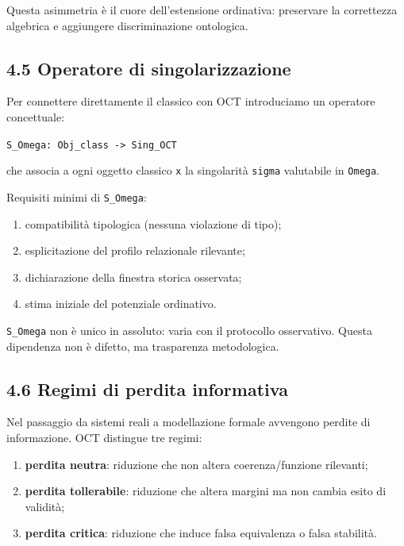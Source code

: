 Questa asimmetria è il cuore dell'estensione ordinativa: preservare la correttezza algebrica e aggiungere discriminazione ontologica.

\subsection{4.5 Operatore di singolarizzazione}

Per connettere direttamente il classico con OCT introduciamo un operatore concettuale:

\texttt{S\_Omega:\ Obj\_class\ -\textgreater{}\ Sing\_OCT}

che associa a ogni oggetto classico \texttt{x} la singolarità \texttt{sigma} valutabile in \texttt{Omega}.

Requisiti minimi di \texttt{S\_Omega}:

\begin{enumerate}
\def\labelenumi{\arabic{enumi}.}
\tightlist
\item
  compatibilità tipologica (nessuna violazione di tipo);
\item
  esplicitazione del profilo relazionale rilevante;
\item
  dichiarazione della finestra storica osservata;
\item
  stima iniziale del potenziale ordinativo.
\end{enumerate}

\texttt{S\_Omega} non è unico in assoluto: varia con il protocollo osservativo. Questa dipendenza non è difetto, ma trasparenza metodologica.

\subsection{4.6 Regimi di perdita informativa}

Nel passaggio da sistemi reali a modellazione formale avvengono perdite di informazione. OCT distingue tre regimi:

\begin{enumerate}
\def\labelenumi{\arabic{enumi}.}
\tightlist
\item
  \textbf{perdita neutra}: riduzione che non altera coerenza/funzione rilevanti;
\item
  \textbf{perdita tollerabile}: riduzione che altera margini ma non cambia esito di validità;
\item
  \textbf{perdita critica}: riduzione che induce falsa equivalenza o falsa stabilità.
\end{enumerate}

